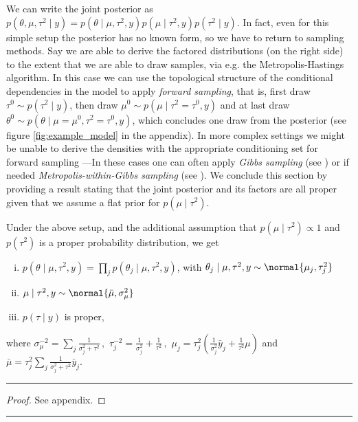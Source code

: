We can write the joint posterior as $p(\theta, \mu, \tau^2 \mid y) = p(\theta \mid \mu, \tau^2, y) p(\mu \mid \tau^2, y) p(\tau^2 \mid y)$.
In fact, even for this simple setup the posterior has no known form, so we have to return to sampling methods.
Say we are able to derive the factored distributions (on the right side) to the extent that we are able to draw samples, via e.g. the Metropolis-Hastings algorithm.
In this case we can use the topological structure of the conditional dependencies in the model to apply \emph{forward sampling}, that is, first draw $\tau^0 \sim p(\tau^2 \mid y)$, then draw $\mu^0 \sim p(\mu \mid \tau^2=\tau^0, y)$ and at last draw $\theta^0 \sim p(\theta \mid \mu=\mu^0, \tau^2=\tau^0, y)$, which concludes one draw from the posterior (see figure \ref{fig:example_model} in the appendix).
In more complex settings we might be unable to derive the densities with the appropriate conditioning set for forward sampling ---In these cases one can often apply \emph{Gibbs sampling} (see \citet{geman1984}) or if needed \emph{Metropolis-within-Gibbs sampling} (see \citet{gilks1995}).
We conclude this section by providing a result stating that the joint posterior and its factors are all proper given that we assume a flat prior for $p(\mu \mid \tau^2)$.

\begin{proposition}\label{prop:hierarchical_posterior}
    Under the above setup, and the additional assumption that $p(\mu \mid \tau^2) \propto 1$ and $p(\tau^2)$ is a proper probability distribution, we get
    \begin{center}
      \begin{enumerate}[i.)]
        \item $p(\theta \mid \mu, \tau^2, y) =  \prod_j p(\theta_j \mid \mu, \tau^2, y)$, with $\theta_j \mid \mu, \tau^2, y \sim \normal{\mu_j, \tau_j^2}$
        \item $\mu \mid \tau^2, y \sim \normal{\bar{\mu}, \sigma_\mu^2}$
        \item $p(\tau \mid y)$ is proper,
      \end{enumerate}
    \end{center}
    where $\sigma_\mu^{-2} = \sum_j \frac{1}{\sigma_j^2 + \tau^2}\,,\,\, \tau_j^{-2}=\frac{1}{\sigma_j^2} + \frac{1}{\tau^2}\,,\,\, \mu_j=\tau_j^2(\frac{1}{\sigma_j^2} \bar{y}_j + \frac{1}{\tau^2}\mu)$ and $\bar{\mu} = \tau_j^2 \sum_j \frac{1}{\sigma_j^2 + \tau^2} \bar{y}_j$.
\end{proposition}
\textcolor{red}{\hrule}
\begin{proof}
See appendix.
\end{proof}
\textcolor{red}{\hrule}

